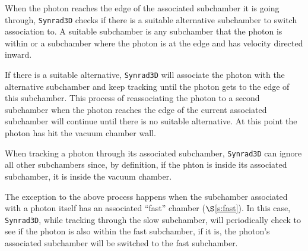 \documentclass[11pt,openany]{report}
\newcommand{\sref}[1]{$\S$\ref{#1}}
\newcommand{\srthree}{\texttt{Synrad3D}\xspace}
\begin{document}
When the photon reaches the edge of the associated subchamber it is going through,
\srthree checks if there is a suitable alternative subchamber to switch association to. A
suitable subchamber is any subchamber that the photon is within or a subchamber where the
photon is at the edge and has velocity directed inward.

If there is a suitable alternative, \srthree will associate the photon with the
alternative subchamber and keep tracking until the photon gets to the edge of this
subchamber.  This process of reassociating the photon to a second subchamber when the
photon reaches the edge of the current associated subchamber will continue until there is
no suitable alternative. At this point the photon has hit the vacuum chamber wall.

When tracking a photon through its associated subchamber, \srthree can ignore all other
subchambers since, by definition, if the phton is inside its associated subchamber, it
is inside the vacuum chamber.

The exception to the above process happens when the subchamber associated with a photon
itself has an associated ``fast'' chamber (\sref{s:fast}). In this case, \srthree, while
tracking through the slow subchamber, will periodically check to see if the photon is also
within the fast subchamber, if it is, the photon's associated subchamber will be switched
to the fast subchamber.
\end{document}

